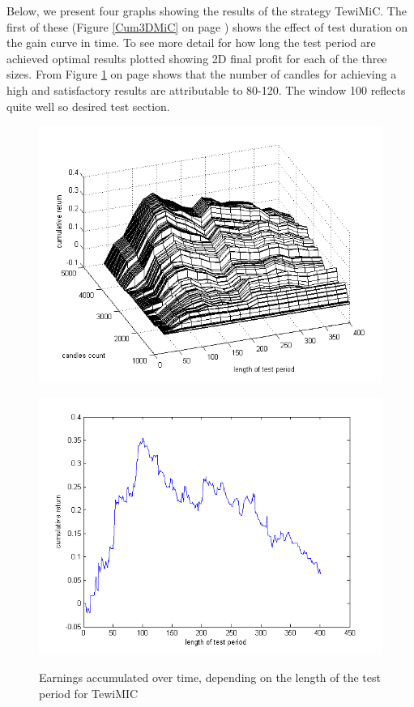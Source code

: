 \documentclass{tewiart}
\begin{document}
Below, we present four graphs showing the results of the strategy TewiMiC. The first of these (Figure \ref{Cum3DMiC} on page \pageref{Cum3DMiC}) shows the effect of test duration on the gain curve in time.
To see more detail for how long the test period are achieved optimal results plotted showing 2D final profit for each of the three sizes.
 From Figure \ref{Cum3DMiCend} on page \pageref{Cum3DMiCend} shows that the number of candles for achieving a high and satisfactory results are attributable to 80-120.
 The window 100 reflects quite well so desired test section.
\begin{figure}[h!]
\begin{minipage}{.45\linewidth}
\begin{center}
\includegraphics[width=\textwidth]{pictures/cumulativeReturnsC.png}
\label{Cum3DMiC}
\end{center}
\end{minipage}
\begin{minipage}{.45\linewidth}
\begin{center}
\includegraphics[width=\textwidth]{pictures/mic_end.png}
\label{Cum3DMiCend}
\end{center}
\end{minipage}
\caption{Earnings accumulated over time, depending on the length of the test period for TewiMIC}
\end{figure}
\FloatBarrier
\end{document}
